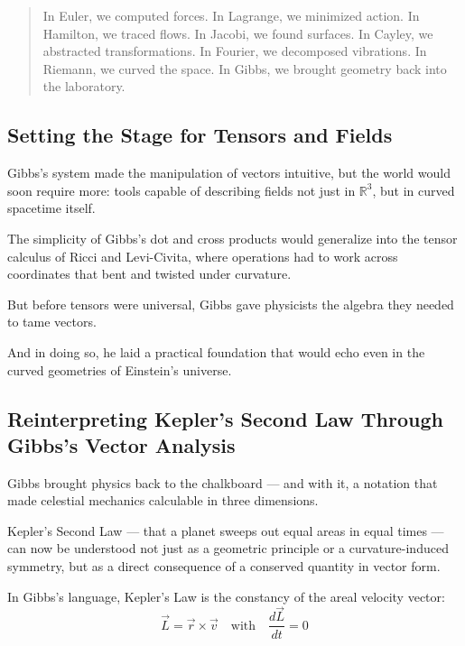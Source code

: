 \bigskip

\begin{quote}
In Euler, we computed forces.  
In Lagrange, we minimized action.  
In Hamilton, we traced flows.  
In Jacobi, we found surfaces.  
In Cayley, we abstracted transformations.  
In Fourier, we decomposed vibrations.  
In Riemann, we curved the space.  
In Gibbs, we brought geometry back into the laboratory.
\end{quote}

\subsection*{Setting the Stage for Tensors and Fields}

Gibbs’s system made the manipulation of vectors intuitive,  
but the world would soon require more:  
tools capable of describing fields not just in \( \mathbb{R}^3 \), but in curved spacetime itself.

The simplicity of Gibbs’s dot and cross products would generalize into the tensor calculus of Ricci and Levi-Civita,  
where operations had to work across coordinates that bent and twisted under curvature.

But before tensors were universal, Gibbs gave physicists the algebra they needed to tame vectors.

And in doing so, he laid a practical foundation that would echo even in the curved geometries of Einstein’s universe.


\subsection*{Reinterpreting Kepler’s Second Law Through Gibbs’s Vector Analysis}

Gibbs brought physics back to the chalkboard — and with it, a notation that made celestial mechanics calculable in three dimensions.

Kepler’s Second Law — that a planet sweeps out equal areas in equal times — can now be understood not just as a geometric principle or a curvature-induced symmetry,  
but as a direct consequence of a conserved quantity in vector form.

\bigskip

\begin{tcolorbox}[colback=blue!5!white, colframe=blue!70!black, title=\textbf{Gibbs’s View: Kepler as a Vector Conservation Law}]
In Gibbs’s language, Kepler’s Law is the constancy of the areal velocity vector:
\[
\vec{L} = \vec{r} \times \vec{v}
\quad \text{with} \quad
\frac{d\vec{L}}{dt} = 0
\]
\end{tcolorbox}

